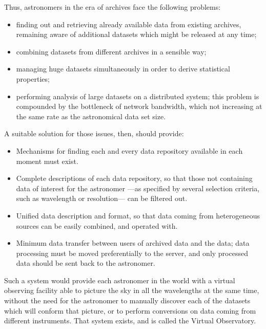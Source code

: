 	 Thus, astronomers in the era of archives face the following
	problems:

	\begin{itemize}
		\item finding out and retrieving already available data from
		existing archives, remaining aware of additional datasets
		which might be released at any time;
		
		 \item combining datasets from different archives in a
		sensible way;
		
		 \item managing huge datasets simultaneously in order to
		derive statistical properties;
		
		 \item performing analysis of large datasets on a
		distributed system; this problem is compounded by the
		bottleneck of network bandwidth, which not increasing at the
		same rate as the astronomical data set size.
	\end{itemize}

	A suitable solution for those issues, then, should provide:

	\begin{itemize}
		\item Mechanisms for finding each and every data repository
		available in each moment must exist.
		
		 \item Complete descriptions of each data repository, so
		that those not containing data of interest for the
		astronomer ---as specified by several selection criteria,
		such as wavelength or resolution--- can be filtered out.
		
		 \item Unified data description and format, so that data
		coming from heterogeneous sources can be easily combined,
		and operated with.
		
		 \item Minimum data transfer between users of archived data
		and the data; data processing must be moved preferentially
		to the server, and only processed data should be sent back
		to the astronomer.
	\end{itemize}

	Such a system would provide each astronomer in the world with a
	virtual observing facility able to picture the sky in all the
	wavelengths at the same time, without the need for the
	astronomer to manually discover each of the datasets which will
	conform that picture, or to perform conversions on data coming
	from different instruments. That system exists, and is called
	the Virtual Observatory.
	
